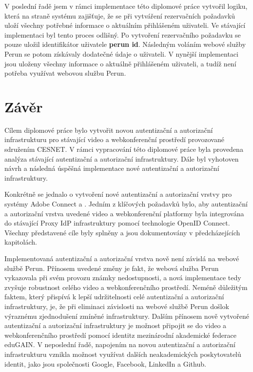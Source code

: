 \documentclass[
  printed, %
  twoside, %
  table,   %
  nolof,     %
  nolot,     %
]{fithesis3}
\begin{document}
V poslední řadě jsem v rámci implementace této diplomové práce vytvořil logiku, která na straně systému  zajišťuje, že se při vytváření rezervačních požadavků uloží všechny potřebné informace o aktuálním přihlášeném uživateli. Ve stávající implementaci byl tento proces odlišný. Po vytvoření rezervačního požadavku se pouze uložil identifikátor uživatele \textbf{perun id}. Následným voláním webové služby Perun se potom získávaly dodatečné údaje o uživateli. V nynější implementaci jsou uloženy všechny informace o aktuálně přihlášeném uživateli, a tudíž není potřeba využívat webovou službu Perun. 

\chapter{Závěr}
Cílem diplomové práce bylo vytvořit novou autentizační a autorizační infrastrukturu pro stávající video a webkonferenční prostředí provozované sdružením CESNET. V rámci vypracování této diplomové práce byla provedena analýza stávající autentizační a autorizační infrastruktury. Dále byl vyhotoven návrh a následná úspěšná implementace nové autentizační a autorizační infrastruktury.  

\par 

Konkrétně se jednalo o vytvoření nové autentizační a autorizační vrstvy pro systémy Adobe Connect a . Jedním z klíčových požadavků bylo, aby autentizační a autorizační vrstva uvedené video a webkonferenční platformy byla integrována do stávající Proxy IdP infrastruktury pomocí technologie OpenID Connect. Všechny představené cíle byly splněny a jsou dokumentovány v předcházejících kapitolách. 

\par
Implementovaná autentizační a autorizační vrstva nově není závislá na webové službě Perun. Přínosem uvedené změny je fakt, že webová služba Perun vykazovala při svém provozu známky nedostupnosti, a nová implementace tedy zvyšuje robustnost celého video a webkonferenčního prostředí. Neméně důležitým faktem, který přispívá k lepší udržitelnosti celé autentizační a autorizační infrastruktury, je, že při eliminaci závislosti na webové službě Perun došlo\break k výraznému zjednodušení zmíněné infrastruktury. Dalším přínosem nově vytvořené autentizační a autorizační infrastruktury je možnost připojit se do video a webkonferenčního prostředí pomocí identit\break z mezinárodní akademické federace eduGAIN. V neposlední řadě, napojením na novou autentizační a autorizační infrastrukturu vznikla možnost využívat dalších neakademických poskytovatelů identit, jako jsou společnosti Google, Facebook, LinkedIn a Github. 
\end{document}

